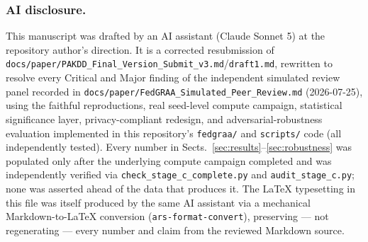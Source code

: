 \documentclass{llncs}
\begin{document}
\subsubsection{AI disclosure.}
This manuscript was drafted by an AI assistant (Claude Sonnet 5) at the repository author's direction. It is a corrected resubmission of \texttt{docs/paper/PAKDD\_Final\_Version\_Submit\_v3.md}/\texttt{draft1.md}, rewritten to resolve every Critical and Major finding of the independent simulated review panel recorded in \texttt{docs/paper/FedGRAA\_Simulated\_Peer\_Review.md} (2026-07-25), using the faithful reproductions, real seed-level compute campaign, statistical significance layer, privacy-compliant redesign, and adversarial-robustness evaluation implemented in this repository's \texttt{fedgraa/} and \texttt{scripts/} code (all independently tested). Every number in Sects.~\ref{sec:results}--\ref{sec:robustness} was populated only after the underlying compute campaign completed and was independently verified via \texttt{check\_stage\_c\_complete.py} and \texttt{audit\_stage\_c.py}; none was asserted ahead of the data that produces it. The LaTeX typesetting in this file was itself produced by the same AI assistant via a mechanical Markdown-to-LaTeX conversion (\texttt{ars-format-convert}), preserving --- not regenerating --- every number and claim from the reviewed Markdown source.
\end{document}
